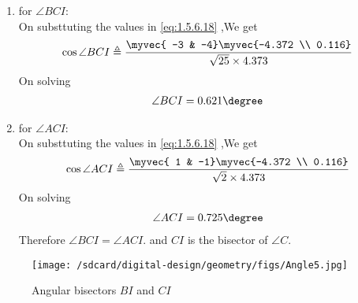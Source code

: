 \documentclass[11pt]{book}
\begin{document}
\begin{enumerate}[label=\thesection.\arabic*.,ref=\thesection.\theenumi]
\begin{enumerate}
\begin{enumerate}
    \item for $\angle BCI$: \\
    On substtuting the values in  \eqref{eq:1.5.6.18} ,We get 
    \begin{align}
        \cos{\angle BCI} \triangleq \frac{\myvec{ -3 & -4}\myvec{-4.372 \\ 0.116}}{ \sqrt{25} \times 4.373} \\
    \end{align}
    On solving 
    \begin{align}
        \angle BCI = 0.621 \degree
    \end{align}
       \item for $\angle ACI$: \\
    On substtuting the values in  \eqref{eq:1.5.6.18} ,We get 
    \begin{align}
        \cos{\angle ACI} \triangleq \frac{\myvec{ 1 & -1}\myvec{-4.372 \\ 0.116}}{ \sqrt{2} \times 4.373} \\
    \end{align}
    On solving 
    \begin{align}
        \angle ACI = 0.725 \degree
    \end{align}
    Therefore $\angle BCI = \angle ACI.$ and $CI$ is the bisector of $\angle C$. 
\end{enumerate}
\begin{figure}[H]
    \centering
    \texttt{[image: /sdcard/digital-design/geometry/figs/Angle5.jpg]}
    \caption{Angular bisectors  $BI$ and $CI$}
    \label{fig:Ang_bisect5}
\end{figure}
\end{enumerate}

\end{enumerate}
\end{document}
